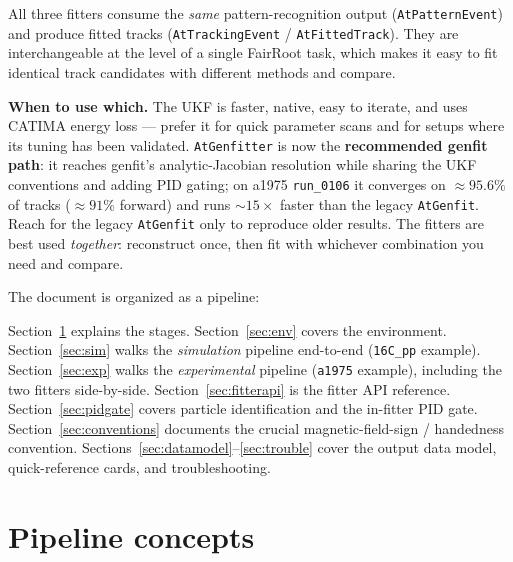 \documentclass[11pt,a4paper]{article}
\newcommand{\code}[1]{\texttt{\small #1}}
\begin{document}
All three fitters consume the \emph{same} pattern-recognition output
(\code{AtPatternEvent}) and produce fitted tracks (\code{AtTrackingEvent} /
\code{AtFittedTrack}). They are interchangeable at the level of a single FairRoot
task, which makes it easy to fit identical track candidates with different methods
and compare.

\begin{notebox}
\textbf{When to use which.} The UKF is faster, native, easy to iterate, and uses
CATIMA energy loss --- prefer it for quick parameter scans and for setups where
its tuning has been validated. \code{AtGenfitter} is now the \textbf{recommended
genfit path}: it reaches genfit's analytic-Jacobian resolution while sharing the
UKF conventions and adding PID gating; on a1975 \code{run\_0106} it converges on
$\approx 95.6\%$ of tracks ($\approx 91\%$ forward) and runs $\sim 15\times$ faster
than the legacy \code{AtGenfit}. Reach for the legacy \code{AtGenfit} only to
reproduce older results. The fitters are best used \emph{together}: reconstruct
once, then fit with whichever combination you need and compare.
\end{notebox}

The document is organized as a pipeline:

\begin{center}
\end{center}

Section~\ref{sec:concepts} explains the stages.
Section~\ref{sec:env} covers the environment.
Section~\ref{sec:sim} walks the \emph{simulation} pipeline end-to-end
(\code{16C\_pp} example).
Section~\ref{sec:exp} walks the \emph{experimental} pipeline (\code{a1975}
example), including the two fitters side-by-side.
Section~\ref{sec:fitterapi} is the fitter API reference.
Section~\ref{sec:pidgate} covers particle identification and the in-fitter PID gate.
Section~\ref{sec:conventions} documents the crucial magnetic-field-sign /
handedness convention.
Sections~\ref{sec:datamodel}--\ref{sec:trouble} cover the output data model,
quick-reference cards, and troubleshooting.

\section{Pipeline concepts}\label{sec:concepts}
\end{document}
